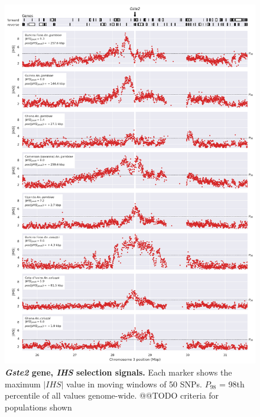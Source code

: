 \documentclass[a4paper,11pt,abstracton,hidelinks]{scrartcl}
\begin{document}
\begin{figure}[t!]
	\begin{center}
		\includegraphics*[width=1\linewidth,center]{artwork/locus_gste2_ihs_pdist.png}
	\end{center}
	\caption[\textit{Gste2} gene, \textit{IHS} selection signals]{
	\textbf{\textit{Gste2} gene, \textit{IHS} selection signals.}
	Each marker shows the maximum $|IHS|$ value in moving windows of 50 SNPs. 
	$P_{98}$ = 98th percentile of all values genome-wide.
	@@TODO criteria for populations shown
	} 
	\label{fig:locus_gste2_ihs}
\end{figure}


\clearpage
\end{document}
